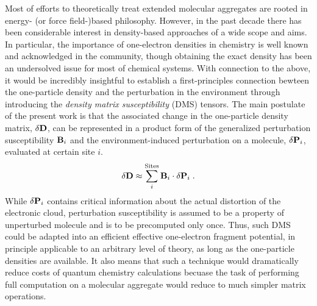 \documentclass[aip,amsmath,amssymb,reprint,floatfix]{revtex4-1}
\begin{document}
Most of efforts to theoretically treat extended molecular aggregates are rooted in 
energy\hyp{} (or force field\hyp{})based philosophy. However,
in the past decade there has been considerable interest in density\hyp{}based approaches
of a wide scope and aims.\cite{Piquemal.Cisneros.Reinhardt.Gresh.Darden.JCP.2006,
Mandado.Hermida-Ramon.JCTC.2011,
Sun.Chan.ACR.2016,
Hedegard.Reiher.JCTC.2016} 
In particular, the importance of
one\hyp{}electron densities in chemistry is well known and acknowledged in the community,\cite{Holas.March.PhysRevA.1991}
though obtaining the exact density has been an undersolved issue for most of chemical systems.
With connection to the above, it would be incredibly insightful 
to establish a first\hyp{}principles connection bewteen the one\hyp{}particle
density and the perturbation in the environment through introducing the
\emph{density matrix susceptibility} (DMS) tensors. 
The main postulate of the present work is that the associated change 
in the one\hyp{}particle density matrix, $\delta {\bf D}$, can be
represented in a product form of the generalized perturbation susceptibility ${\bf B}_i$
and the environment\hyp{}induced perturbation on a molecule, $\delta {\bf P}_i$,
evaluated at certain site $i$.
%
\begin{equation*} \label{e:initial-model}
  \delta {\bf D} \approx \sum_i^{\text{Sites}} {\bf B}_i
  \cdot  \delta {\bf P}_i \;.
\end{equation*}
%
While $\delta {\bf P}_i$ contains critical information 
about the actual distortion of the electronic cloud,
perturbation susceptibility is assumed to be a property of unperturbed 
molecule and is to be precomputed only once. 
Thus, such DMS could be adapted into an efficient effective 
one\hyp{}electron fragment potential, in principle applicable to an arbitrary
level of theory, as long as the one\hyp{}particle densities are available.
It also means that such a technique would dramatically reduce costs of quantum chemistry calculations
becuase the task of performing full computation on a molecular aggregate
would reduce to much simpler matrix operations.
\end{document}
